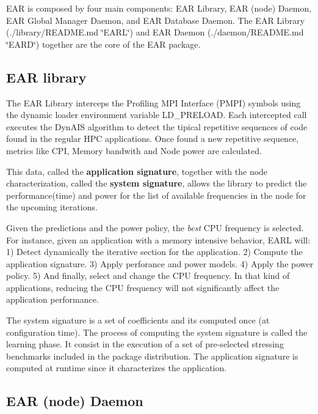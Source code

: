 E\+AR is composed by four main components\+: E\+AR Library, E\+AR (node) Daemon, E\+AR Global Manager Daemon, and E\+AR Database Daemon. The E\+AR Library (./library/\+R\+E\+A\+D\+ME.md \char`\"{}\+E\+A\+R\+L\char`\"{}) and E\+AR Daemon (./daemon/\+R\+E\+A\+D\+ME.md \char`\"{}\+E\+A\+R\+D\char`\"{}) together are the core of the E\+AR package.

\subsection*{E\+AR library}

The E\+AR Library interceps the Profiling M\+PI Interface (P\+M\+PI) symbols using the dynamic loader environment variable L\+D\+\_\+\+P\+R\+E\+L\+O\+AD. Each intercepted call executes the Dyn\+A\+IS algorithm to detect the tipical repetitive sequences of code found in the regular H\+PC applications. Once found a new repetitive sequence, metrics like C\+PI, Memory bandwith and Node power are calculated.

This data, called the {\bfseries application signature}, together with the node characterization, called the {\bfseries system signature}, allows the library to predict the performance(time) and power for the list of available frequencies in the node for the upcoming iterations.

Given the predictions and the power policy, the {\itshape best} C\+PU frequency is selected. For instance, given an application with a memory intensive behavior, E\+A\+RL will\+: 1) Detect dynamically the iterative section for the application. 2) Compute the application signature. 3) Apply perforance and power models. 4) Apply the power policy. 5) And finally, select and change the C\+PU frequency. In that kind of applications, reducing the C\+PU frequency will not significantly affect the application performance.

The system signature is a set of coefficients and it\textquotesingle{}s computed once (at configuration time). The process of computing the system signature is called the learning phase. It consist in the execution of a set of pre-\/selected stressing benchmarks included in the package distribution. The application signature is computed at runtime since it characterizes the application.

\subsection*{E\+AR (node) Daemon}

